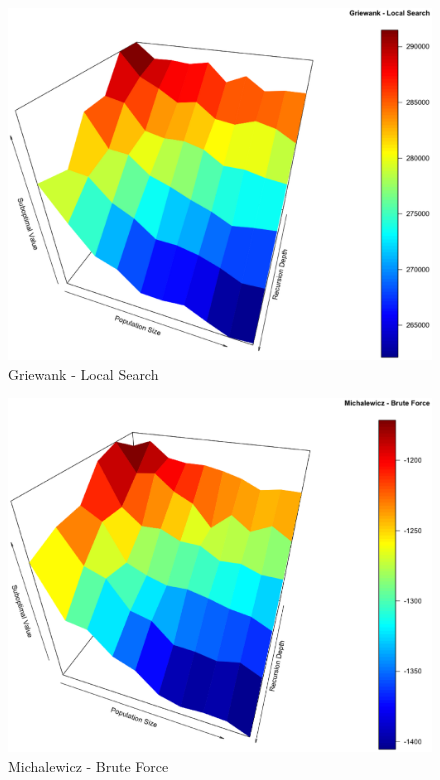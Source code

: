 \documentclass[conference]{IEEEtran}
\begin{document}
\begin{figure}[tbp]
\centering
\includegraphics[width=1.0\hsize]{fig15.eps}
\caption{Griewank - Local Search}
\label{fig05}
\end{figure}

\begin{figure}[tbp]
\centering
\includegraphics[width=1.0\hsize]{fig18.eps}
\caption{Michalewicz - Brute Force}
\label{fig06}
\end{figure}
\end{document}

